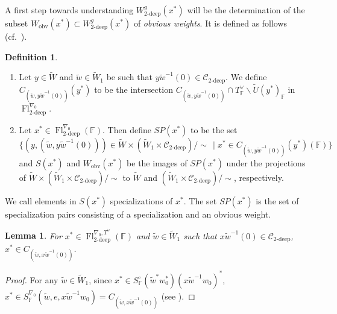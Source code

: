 \documentclass[oneside,a4paper,english, 11pt]{amsart}
\theoremstyle{plain}
\theoremstyle{plain}
\theoremstyle{plain}
\newtheorem{lemma}[thm]{Lemma}
\theoremstyle{plain}
\theoremstyle{plain}
\theoremstyle{plain}
\theoremstyle{definition}
\newtheorem{defn}[thm]{Definition}
\theoremstyle{definition}
\theoremstyle{definition}
\theoremstyle{remark}
\numberwithin{equation}{section}
\newcommand{\F}{\mathbb{F}}
\newcommand{\cC}{\mathcal{C}}
\newcommand{\tld}[1]{\widetilde{#1}}
\newcommand{\obv}{\mathrm{obv}}
\DeclareMathOperator{\Fl}{Fl}
\begin{document}
A first step towards understanding $W^g_{2\textrm{-deep}}(x^*)$ will be the determination of the subset $W_{\mathrm{obv}}(x^*) \subset W^g_{2\textrm{-deep}}(x^*)$ of \emph{obvious weights}. It is defined as follows (cf.~\cite{OBW}).

%

%
%
%

\begin{defn}\label{defn:OW}
\begin{enumerate}
\item
Let $y\in \tld{W}$ and $\tld{w}\in \tld{W}_1$ be such that $y\tld{w}^{-1}(0)\in\cC_{2\text{-deep}}$. 
We define $C_{(\tld{w},y\tld{w}^{-1}(0))}(y^*)$ to be the intersection $C_{(\tld{w},y\tld{w}^{-1}(0))}\cap T_\F^\vee\backslash \tld{U}(y^*)_{\F}$ in $\Fl_{2\textrm{-deep}}^{\nabla_0}$.
\item
Let $x^* \in \Fl_{2\textrm{-deep}}^{\nabla_0}(\F)$. %
Then define $SP(x^*)$ to be the set 
\[
\{(y,(\tld{w},y\tld{w}^{-1}(0))) \in \tld{W} \times (\tld{W}_1 \times \cC_{2\text{-deep}})/\sim\, \mid x^* \in C_{(\tld{w},y\tld{w}^{-1}(0))}(y^*)(\F)\}
\]
%
and $S(x^*)$ and $W_{\obv}(x^*)$ be the images of $SP(x^*)$ under the projections of $\tld{W} \times (\tld{W}_1 \times \cC_{2\text{-deep}})/\sim$ to $\tld{W}$ and $(\tld{W}_1 \times \cC_{2\text{-deep}})/\sim$, respectively. 
\end{enumerate}
\end{defn}

We call elements in $S(x^*)$ specializations of $x^*$.  The set $SP(x^*)$ is the set of specialization pairs consisting of a specialization and an obvious weight.  


\begin{lemma}\label{lemma:obvgeom}
For $x^* \in \Fl_{2\textrm{-deep}}^{\nabla_0,T^\vee}(\F)$ and $\tld{w}\in \tld{W}_1$ such that $x\tld{w}^{-1}(0)\in \cC_{2\text{-deep}}$, $x^* \in C_{(\tld{w},x\tld{w}^{-1}(0))}$.
\end{lemma}
\begin{proof}
For any $\tld{w} \in \tld{W}_1$, since $x^* \in S^\circ_{\F}(\tld{w}^* w_0^*) (x \tld{w}^{-1} w_0)^*$, $x^* \in S_\F^{\nabla_0}(\tld{w},e,x\tld{w}^{-1}w_0) = C_{(\tld{w},x\tld{w}^{-1}(0))}$ (see \cite[(4.9) and Prop.~4.3.5]{MLM}).
\end{proof}
\end{document}
